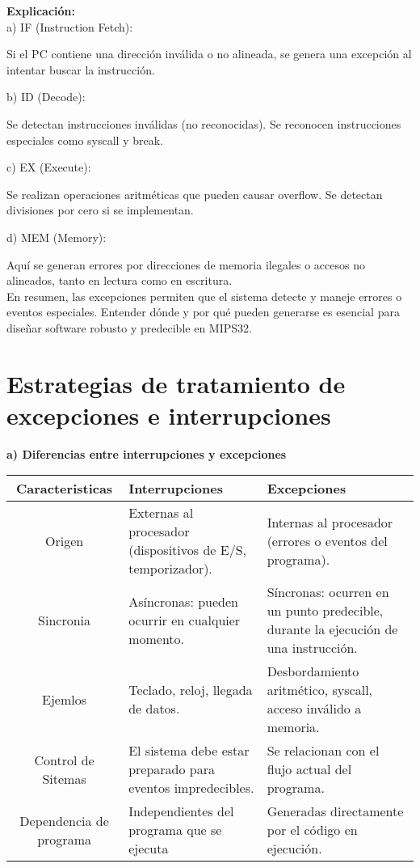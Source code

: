 \documentclass[]{article}
\begin{document}
 \textbf{Explicación:} \\
 
a) IF (Instruction Fetch):

Si el PC contiene una dirección inválida o no alineada, se genera una excepción al intentar buscar la instrucción.

b) ID (Decode):

Se detectan instrucciones inválidas (no reconocidas). Se reconocen instrucciones especiales como syscall y break.

c) EX (Execute):

Se realizan operaciones aritméticas que pueden causar overflow. Se detectan divisiones por cero si se implementan.

d) MEM (Memory):

Aquí se generan errores por direcciones de memoria ilegales o accesos no alineados, tanto en lectura como en escritura. \\

En resumen, las excepciones permiten que el sistema detecte y maneje errores o eventos especiales. Entender dónde y por qué pueden generarse es esencial para diseñar software robusto y predecible en MIPS32.

\section{Estrategias de tratamiento de excepciones e interrupciones}

\textbf{a) Diferencias entre interrupciones y excepciones} \\

\begin{tabular}{|c|p{3.5cm}|p{}|}
	\hline
	Caracteristicas & Interrupciones & Excepciones \\
	\hline
	Origen & Externas al procesador (dispositivos de E/S, temporizador). & Internas al procesador (errores o eventos del programa). \\
	\hline
	Sincronia & Asíncronas: pueden ocurrir en cualquier momento. & Síncronas: ocurren en un punto predecible, durante la ejecución de una instrucción. \\
	\hline
	Ejemlos & Teclado, reloj, llegada de datos. & Desbordamiento aritmético, syscall, acceso inválido a memoria. \\
	\hline
	Control de Sitemas & El sistema debe estar preparado para eventos impredecibles. & Se relacionan con el flujo actual del programa. \\
	\hline
	Dependencia de programa & Independientes del programa que se ejecuta & Generadas directamente por el código en ejecución. \\
	\hline
\end{tabular}
\end{document}
